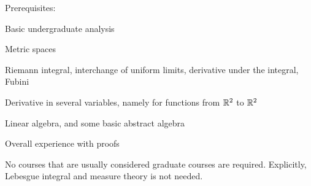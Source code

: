 \documentclass[10pt,aspectratio=169]{beamer}
\begin{document}
\begin{frame}
Prerequisites:

\medskip
\pause

Basic undergraduate analysis

\medskip
\pause

\quad Metric spaces

\pause

\quad Riemann integral, interchange of uniform limits, derivative
under the integral, Fubini

\pause

\quad Derivative in several variables, namely for functions from ${\mathbb{R}}^2$ to
${\mathbb{R}}^2$

\pause
\medskip

Linear algebra, and some basic abstract algebra

\pause
\medskip

Overall experience with proofs

\pause
\medskip

No courses that are usually considered graduate courses are required.
Explicitly, Lebesgue integral and measure theory is not needed.

\end{frame}
\end{document}
